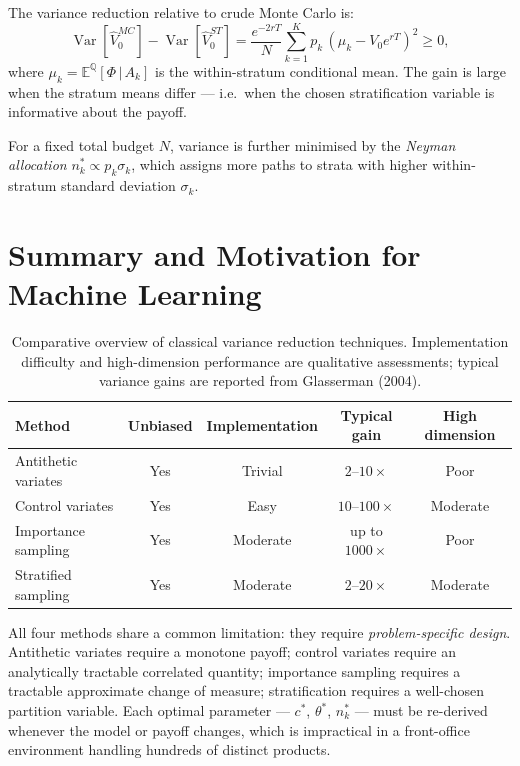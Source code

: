\documentclass[12pt, a4paper]{report}
\theoremstyle{definition}
\newcommand{\EQ}{\mathbb{E}^{\mathbb{Q}}}
\newcommand{\Var}{\operatorname{Var}}
\begin{document}
The variance reduction relative to crude Monte Carlo is:
\begin{equation}
    \Var[\hat{V}_0^{MC}] - \Var[\hat{V}_0^{ST}]
    = \frac{e^{-2rT}}{N} \sum_{k=1}^{K} p_k\,(\mu_k - V_0 e^{rT})^2
    \geq 0,
    \label{eq:strat-gain}
\end{equation}
where $\mu_k = \EQ[\Phi \,|\, A_k]$ is the within-stratum conditional
mean.  The gain is large when the stratum means differ --- i.e.\ when
the chosen stratification variable is informative about the payoff.

For a fixed total budget $N$, variance is further minimised by the
\emph{Neyman allocation} $n_k^* \propto p_k \sigma_k$, which assigns
more paths to strata with higher within-stratum standard deviation
$\sigma_k$.

\section{Summary and Motivation for Machine Learning}
\label{sec:vr-summary}

\begin{table}[H]
\centering
\caption{Comparative overview of classical variance reduction
         techniques.  Implementation difficulty and high-dimension
         performance are qualitative assessments; typical variance
         gains are reported from Glasserman (2004).}
\label{tab:vr-comparison}
\renewcommand{\arraystretch}{1.4}
\begin{tabular}{lcccc}
\toprule
\textbf{Method} & \textbf{Unbiased} & \textbf{Implementation}
                & \textbf{Typical gain} & \textbf{High dimension} \\
\midrule
Antithetic variates  & Yes & Trivial  & $2$--$10\times$    & Poor \\
Control variates     & Yes & Easy     & $10$--$100\times$  & Moderate \\
Importance sampling  & Yes & Moderate & up to $1000\times$ & Poor \\
Stratified sampling  & Yes & Moderate & $2$--$20\times$    & Moderate \\
\bottomrule
\end{tabular}
\end{table}

All four methods share a common limitation: they require
\emph{problem-specific design}.  Antithetic variates require a monotone
payoff; control variates require an analytically tractable correlated
quantity; importance sampling requires a tractable approximate change of
measure; stratification requires a well-chosen partition variable.  Each
optimal parameter --- $c^*$, $\theta^*$, $n_k^*$ --- must be re-derived
whenever the model or payoff changes, which is impractical in a
front-office environment handling hundreds of distinct products.
\end{document}
